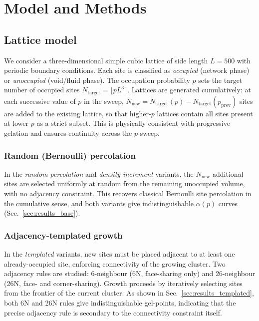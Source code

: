 \section{Model and Methods}
\label{sec:methods}

\subsection{Lattice model}

We consider a three-dimensional simple cubic lattice of side length $L = 500$ with periodic boundary conditions. Each site is classified as \emph{occupied} (network phase) or \emph{unoccupied} (void/fluid phase). The occupation probability $p$ sets the target number of occupied sites $N_\mathrm{target} = \lfloor p L^3 \rceil$. Lattices are generated cumulatively: at each successive value of $p$ in the sweep, $N_\mathrm{new} = N_\mathrm{target}(p) - N_\mathrm{target}(p_\mathrm{prev})$ sites are added to the existing lattice, so that higher-$p$ lattices contain all sites present at lower $p$ as a strict subset. This is physically consistent with progressive gelation and ensures continuity across the $p$-sweep.

\subsubsection{Random (Bernoulli) percolation}

In the \emph{random percolation} and \emph{density-increment} variants, the $N_\mathrm{new}$ additional sites are selected uniformly at random from the remaining unoccupied volume, with no adjacency constraint. This recovers classical Bernoulli site percolation in the cumulative sense, and both variants give indistinguishable $\alpha(p)$ curves (Sec.~\ref{sec:results_base}).

\subsubsection{Adjacency-templated growth}

In the \emph{templated} variants, new sites must be placed adjacent to at least one already-occupied site, enforcing connectivity of the growing cluster. Two adjacency rules are studied: 6-neighbour (6N, face-sharing only) and 26-neighbour (26N, face- and corner-sharing). Growth proceeds by iteratively selecting sites from the frontier of the current cluster. As shown in Sec.~\ref{sec:results_templated}, both 6N and 26N rules give indistinguishable gel-points, indicating that the precise adjacency rule is secondary to the connectivity constraint itself.

